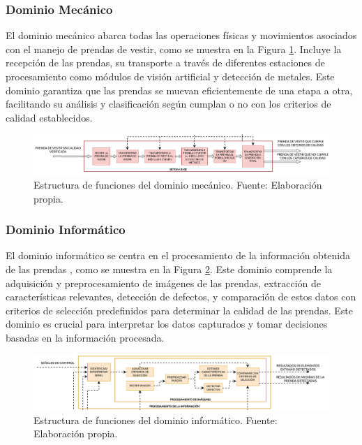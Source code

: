 \subsubsection{Dominio Mecánico}

El dominio mecánico abarca todas las operaciones físicas y movimientos asociados con el manejo de prendas de vestir, como se muestra en la Figura \ref{fig:EF_DM}. Incluye la recepción de las prendas, su transporte a través de diferentes estaciones de procesamiento como módulos de visión artificial y detección de metales. Este dominio garantiza que las prendas se muevan eficientemente de una etapa a otra, facilitando su análisis y clasificación según cumplan o no con los criterios de calidad establecidos.

\begin{figure}[h]
	\centering
	\includegraphics[width=\textwidth]{img/EF_DM.pdf}
	\caption[Estructura de funciones del dominio mecánico.]{Estructura de funciones del dominio mecánico. Fuente: Elaboración propia.}
	\label{fig:EF_DM}
\end{figure}

\subsubsection{Dominio Informático}

El dominio informático se centra en el procesamiento de la información obtenida de las prendas , como se muestra en la Figura \ref{fig:EF_DIn}. Este dominio comprende la adquisición y preprocesamiento de imágenes de las prendas, extracción de características relevantes, detección de defectos, y comparación de estos datos con criterios de selección predefinidos para determinar la calidad de las prendas. Este dominio es crucial para interpretar los datos capturados y tomar decisiones basadas en la información procesada.

\begin{figure}[h]
	\centering
	\includegraphics[width=\textwidth]{img/EF_DIn.pdf}
	\caption[Estructura de funciones del dominio informático.]{Estructura de funciones del dominio informático. Fuente: Elaboración propia.}
	\label{fig:EF_DIn}
\end{figure}


